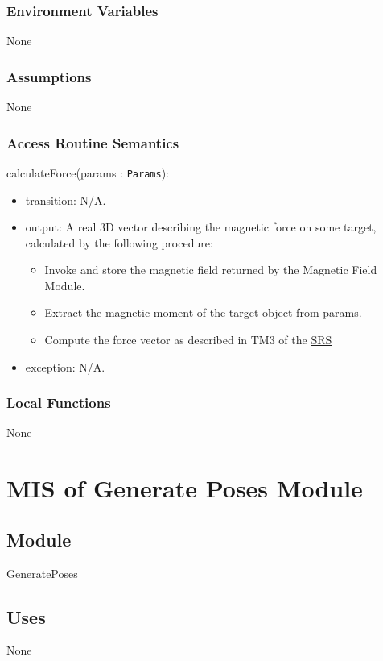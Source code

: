 \documentclass[12pt, titlepage]{article}
\begin{document}
\subsubsection{Environment Variables}
None

\subsubsection{Assumptions}
None 

\subsubsection{Access Routine Semantics}
\noindent calculateForce(params : \texttt{Params}):
\begin{itemize}
\item transition: N/A.
\item output: A real 3D vector describing the magnetic force on some target, calculated by the following procedure:
\begin{itemize}
  \item Invoke and store the magnetic field returned by the Magnetic Field Module. 
  \item Extract the magnetic moment of the target object from params. 
  \item Compute the force vector as described in TM3 of the \href{https://github.com/husseinsd1/optimal-em-arrangement/blob/main/docs/SRS/SRS.pdf}{SRS}
\end{itemize} 
\item exception: N/A.
\end{itemize}

\subsubsection{Local Functions}
None
\newpage

\section{MIS of Generate Poses Module} \label{MISGenPoses}
\subsection{Module}
GeneratePoses

\subsection{Uses}
None
\end{document}
